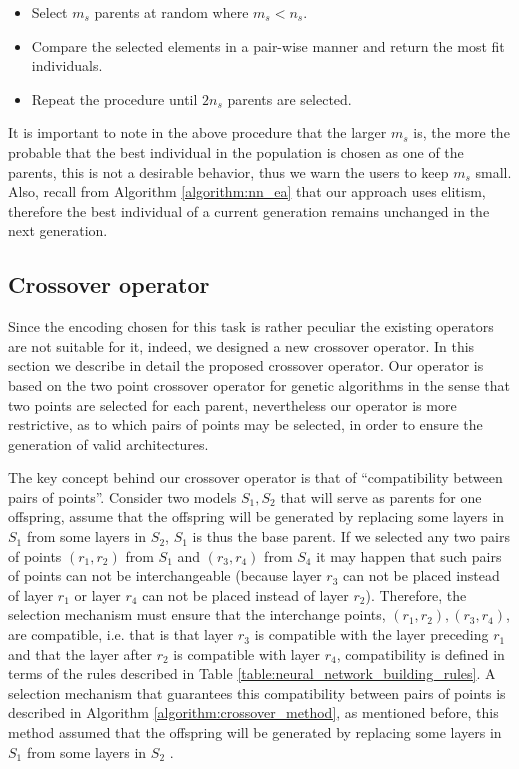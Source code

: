 \documentclass[journal]{IEEEtran}
\begin{document}
\begin{itemize}
\item Select $m_s$ parents at random where $m_s < n_s$.
\item Compare the selected elements in a pair-wise manner and return the most fit individuals.
\item Repeat the procedure until $2n_s$ parents are selected.
\end{itemize}

It is important to note in the above procedure that the larger $m_s$ is, the more the probable that the best individual in the population is chosen as one of the parents, this is not a desirable behavior, thus we warn the users to keep $m_s$ small. Also, recall from Algorithm \ref{algorithm:nn_ea} that our approach uses elitism, therefore the best individual of a current generation remains unchanged in the next generation.

\subsection{Crossover operator}
\label{sec:crossover}

Since the encoding chosen for this task is rather peculiar the existing operators are not suitable for it, indeed, we designed a new crossover operator. In this section we describe in detail the proposed crossover operator. Our operator is based on the two point crossover operator for genetic algorithms \cite{holland1992} in the sense that two points are selected for each parent, nevertheless our operator is more restrictive, as to which pairs of points may be selected, in order to ensure the generation of valid architectures. 

The key concept behind our crossover operator is that of  ``compatibility between pairs of points''. Consider two models $S_1, S_2$ that will serve as parents for one offspring, assume that the offspring will be generated by replacing some layers in $S_1$ from some layers in $S_2$, $S_1$ is thus the base parent. If we selected any two pairs of points $(r_1, r_2)$ from $S_1$ and $(r_3, r_4)$ from $S_4$ it may happen that such pairs of points can not be interchangeable (because layer $r_3$ can not be placed instead of layer $r_1$ or layer $r_4$ can not be placed instead of layer $r_2$). Therefore, the selection mechanism must ensure that the interchange points, $(r_1, r_2), (r_3, r_4)$, are compatible, i.e. that is that layer $r_3$ is compatible with the layer preceding $r_1$ and that the layer after $r_2$ is compatible with layer $r_4$, compatibility is defined in terms of the rules described in Table \ref{table:neural_network_building_rules}. A selection mechanism that guarantees this compatibility between pairs of points is described in Algorithm \ref{algorithm:crossover_method}, as mentioned before, this method assumed that the offspring will be generated by replacing some layers in $S_1$ from some layers in $S_2$ .
\end{document}
